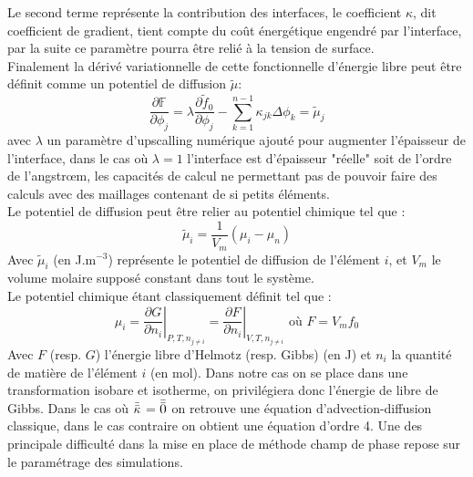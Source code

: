 Le second terme représente la contribution des interfaces, le coefficient $\kappa$, dit coefficient de gradient, tient compte du coût énergétique engendré par l'interface, par la suite ce paramètre pourra être relié à la tension de surface. \\
Finalement la dérivé variationnelle de cette fonctionnelle d'énergie libre peut être définit comme un potentiel de diffusion $\tilde{\mu}$: 
\begin{equation}\label{eq_potentiel}
	\frac{\partial \mathbb{F}}{\partial \phi_j} =\lambda \frac{\partial \tilde{f}_0}{\partial \phi_j} -\sum_{k=1}^{n-1} \kappa_{jk} \Delta \phi_k = \tilde{\mu}_j
\end{equation}
avec $\lambda$ un paramètre d'upscalling numérique ajouté pour augmenter l'épaisseur de l'interface, dans le cas où $\lambda=1$ l'interface est d'épaisseur "réelle" soit de l'ordre de l'angstr\oe m, les capacités de calcul ne permettant pas de pouvoir faire des calculs avec des maillages contenant de si petits éléments. \\
Le potentiel de diffusion peut être relier au potentiel chimique tel que :
\begin{equation}
	\tilde{\mu}_i = \frac{1}{V_m}\left(\mu_i - \mu_n\right)
\end{equation}
Avec $\tilde{\mu}_i$ (en J.m$^{-3}$) représente le potentiel de diffusion de l'élément $i$, et $V_m$ le volume molaire supposé constant dans tout le système.\\
Le potentiel chimique étant classiquement définit tel que :
\begin{equation}
	\mu_i = \left.\frac{\partial G}{\partial n_i}\right|_{P,T,n_{j\neq i }} = \left.\frac{\partial F}{\partial n_i}\right|_{V,T,n_{j\neq i }}
	  \textrm{                        où           } F = V_m f_0
\end{equation}
Avec $F$ (resp. $G$) l'énergie libre d'Helmotz (resp. Gibbs) (en J) et $n_i$ la quantité de matière de l'élément $i$ (en mol). Dans notre cas on se place dans une transformation isobare et isotherme, on privilégiera donc l'énergie de libre de Gibbs.
Dans le cas où $\bar{\bar{\kappa}}$ = $\bar{\bar{0}}$ on retrouve une équation d'advection-diffusion classique, dans le cas contraire on obtient une équation d'ordre 4. Une des principale difficulté dans la mise en place de méthode champ de phase repose sur le paramétrage des simulations.
